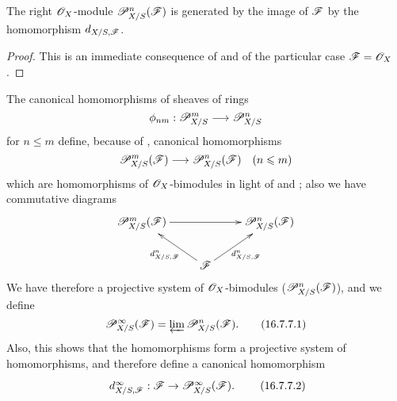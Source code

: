 \begin{proposition}[16.7.6]
\label{IV.16.7.6}
The right $\mathscr{O}_X$-module $\mathscr{P}_{X/S}^n(\mathscr{F})$ is generated by the image of $\mathscr{F}$ by the homomorphism $d_{X/S, \mathscr{F}}$.
\end{proposition}

\begin{proof}
This is an immediate consequence of  and of the particular case $\mathscr{F} = \mathscr{O}_X$ .
\end{proof}

\begin{env}[16.7.7]
\label{IV.16.7.7}
The canonical homomorphisms of sheaves of rings
\[
  \vphi_{nm}:\sh{P}_{X/S}^m \to \sh{P}_{X/S}^n 
\]
for $n \leq m$  define, because of , canonical homomorphisms 
\[
  \sh{P}_{X/S}^m(\sh{F}) \to \sh{P}_{X/S}^n(\sh{F}) \quad (n \leq m)
\]
which are homomorphisms of $\mathscr{O}_X$-bimodules in light of  and ;
also we have commutative diagrams
\[
  \xymatrix{
    \sh{P}_{X/S}^m(\sh{F}) \ar[rr] && \sh{P}_{X/S}^n(\sh{F}) \\
      & \sh{F} \ar[ul]^-{d_{X/S,\sh{F}}^n} \ar[ur]_-{d_{X/S,\sh{F}}^n}
  }
\]
We have therefore a projective system of $\mathscr{O}_X$-bimodules ($\mathscr{P}_{X/S}^n(\mathscr{F})$), and we define
\[
  \label{IV.16.7.7.1}
  \mathscr{P}_{X/S}^\infty(\mathscr{F}) = \varprojlim \mathscr{P}_{X/S}^n(\mathscr{F}).
  \tag{16.7.7.1}
\]
Also, this shows that the homomorphisms  form a projective system of homomorphisms, and therefore define a canonical homomorphism
\[
  \label{IV.16.7.7.2}
  \xymatrix{
    d_{X/S,\sh{F}}^\infty: \sh{F} \to \sh{P}_{X/S}^\infty(\sh{F}).
  }
  \tag{16.7.7.2}
\]
\end{env}


